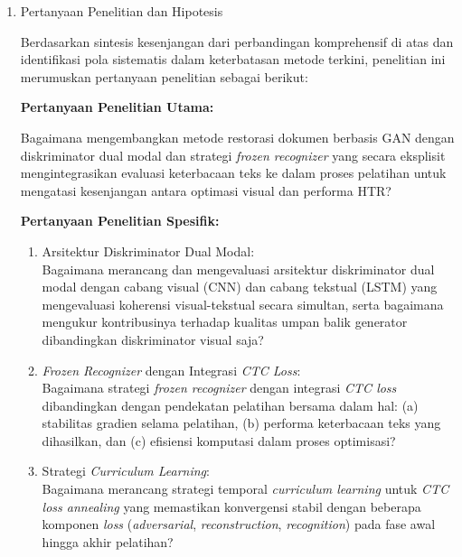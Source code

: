\documentclass[12pt,a4paper]{article}
\begin{document}
\begin{enumerate}[leftmargin=*, labelindent=0pt, itemsep=1ex, topsep=0pt]

\item Pertanyaan Penelitian dan Hipotesis

Berdasarkan sintesis kesenjangan dari perbandingan komprehensif di atas dan identifikasi pola sistematis dalam keterbatasan metode terkini, penelitian ini merumuskan pertanyaan penelitian sebagai berikut:

\noindent\textbf{Pertanyaan Penelitian Utama:}

Bagaimana mengembangkan metode restorasi dokumen berbasis GAN dengan diskriminator dual modal dan strategi \textit{frozen recognizer} yang secara eksplisit mengintegrasikan evaluasi keterbacaan teks ke dalam proses pelatihan untuk mengatasi kesenjangan antara optimasi visual dan performa HTR?

\noindent\textbf{Pertanyaan Penelitian Spesifik:}

\begin{enumerate}[leftmargin=1.5em, labelsep=0.5em, itemindent=0pt, label=\arabic*., topsep=0pt, parsep=0pt, itemsep=0pt]
      \item Arsitektur Diskriminator Dual Modal: \\
            Bagaimana merancang dan mengevaluasi arsitektur diskriminator dual modal dengan cabang visual (CNN) dan cabang tekstual (LSTM) yang mengevaluasi koherensi visual-tekstual secara simultan, serta bagaimana mengukur kontribusinya terhadap kualitas umpan balik generator dibandingkan diskriminator visual saja?

      \item \textit{Frozen Recognizer} dengan Integrasi \textit{CTC Loss}: \\
            Bagaimana strategi \textit{frozen recognizer} dengan integrasi \textit{CTC loss} dibandingkan dengan pendekatan pelatihan bersama dalam hal: (a) stabilitas gradien selama pelatihan, (b) performa keterbacaan teks yang dihasilkan, dan (c) efisiensi komputasi dalam proses optimisasi?

      \item Strategi \textit{Curriculum Learning}: \\
            Bagaimana merancang strategi temporal \textit{curriculum learning} untuk \textit{CTC loss annealing} yang memastikan konvergensi stabil dengan beberapa komponen \textit{loss} (\textit{adversarial}, \textit{reconstruction}, \textit{recognition}) pada fase awal hingga akhir pelatihan?


\end{enumerate}
\end{enumerate}
\end{document}
